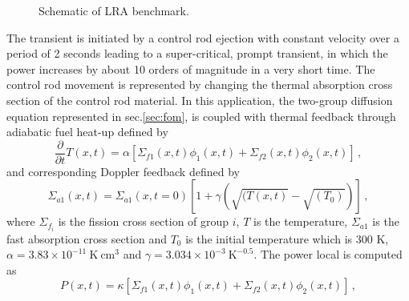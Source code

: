 \documentclass[]{interact}
\theoremstyle{plain}%
\theoremstyle{definition}
\theoremstyle{remark}
\begin{document}
\begin{figure}[h!]
	\caption{Schematic of LRA benchmark.}
	\label{fig:lra core}
\end{figure}
The transient is initiated by a control rod ejection with constant velocity over a period of 2 seconds leading to a super-critical, prompt transient, in which the power increases by about 10 orders of magnitude in a very short time.
The control rod movement is represented by changing the thermal absorption cross section of the control rod material.
In this application, the two-group diffusion equation represented in sec.\ref{sec:fom}, is coupled with thermal feedback through adiabatic fuel heat-up defined by
\begin{equation}
	\frac{\partial}{\partial t}T(x,t) = \alpha[\Sigma_{f1}(x,t)\phi_1(x,t)+\Sigma_{f2}(x,t)\phi_2(x,t)] \, ,
	\label{eq:heatup}
\end{equation}
and corresponding Doppler feedback defined by
\begin{equation}
	\Sigma_{a1}(x,t) = \Sigma_{a1}(x,t=0)[1+\gamma(\sqrt{(T(x,t)}-\sqrt{(T_0)})] \, ,
	\label{eq:doppler}
\end{equation}
where $\Sigma_{f_i}$ is the fission cross section of group $i$, $T$ is the temperature, $\Sigma_{a1}$ is the fast absorption cross section and $T_0$ is the initial temperature which is $300 $ K,
$\alpha = 3.83\times 10^{-11}~\text{K}~\text{cm}^3$ and $\gamma = 3.034\times 10^{-3} ~\text{K}^{-0.5}$.
The power local is computed as
\begin{equation}
	P(x,t)=\kappa [\Sigma_{f1}(x,t)\phi_1(x,t)+\Sigma_{f2}(x,t)\phi_2(x,t)] \, ,
\end{equation}
\end{document}
